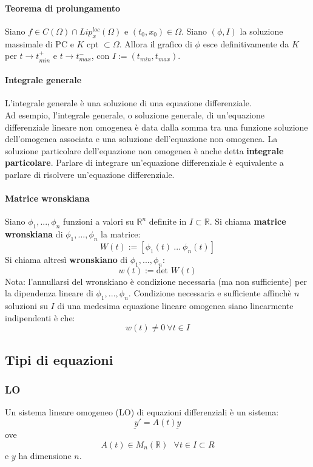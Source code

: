 \documentclass[a4paper,12pt]{article}
\begin{document}
\paragraph{Teorema di prolungamento}
Siano  $f \in C\left(\Omega\right) \cap Lip^{loc}_x\left(\Omega\right)$ e $\left(t_0,x_0\right) \in \Omega$. Siano $\left(\phi,I\right)$ la soluzione massimale di PC e $K$ cpt $\subset \Omega$. Allora il grafico di $\phi$ esce definitivamente da $K$ per $t\rightarrow t^+_{min}$ e $t\rightarrow t^-_{max}$, con $I:=(t_{min},t_{max})$.

\paragraph{Integrale generale}
L'integrale generale è una soluzione di una equazione differenziale.\\
Ad esempio, l'integrale generale, o soluzione generale, di un'equazione differenziale lineare non omogenea è data dalla somma tra una funzione soluzione dell'omogenea associata e una soluzione dell'equazione non omogenea. La soluzione particolare dell'equazione non omogenea è anche detta \textbf{integrale particolare}. Parlare di integrare un'equazione differenziale è equivalente a parlare di risolvere un'equazione differenziale.

\paragraph{Matrice wronskiana}
Siano $\phi_1,...,\phi_n$ funzioni a valori su $\mathbb{R}^n$ definite in $I\subset \mathbb{R}$.
Si chiama \textbf{matrice wronskiana} di $\phi_1,...,\phi_n$ la matrice:
$$W(t):=[\phi_1(t)\ ...\ \phi_n(t)]$$
Si chiama altresì \textbf{wronskiano} di $\phi_1,...,\phi_n$:
$$w(t):=\text{det } W(t)$$
Nota: l'annullarsi del wronskiano è condizione necessaria (ma non sufficiente) per la dipendenza lineare di $\phi_1,...,\phi_n$. 
Condizione necessaria e sufficiente affinchè $n$ soluzioni su $I$ di una medesima equazione lineare omogenea siano linearmente indipendenti è che:
$$ w(t)\neq0 \ \forall t \in I$$


\subsection{Tipi di equazioni}
\subsubsection{LO}
Un sistema lineare omogeneo (LO) di equazioni differenziali è un sistema:
$$\underbar{y}' = A(t)\underbar{y}$$
ove $$A(t)\in M_n(\mathbb{R})\ \ \ \forall t\in I\subset R$$ e $\underbar{y}$ ha dimensione $n$.
\end{document}
